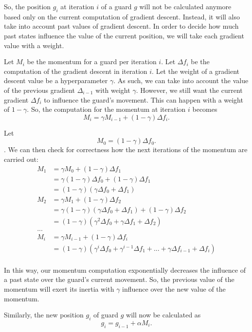 So, the position $g_i$ at iteration $i$ of a guard $g$ will not be calculated anymore based only on the current computation of gradient descent. Instead, it will also take into account past values of gradient descent. In order to decide how much past states influence the value of the current position, we will take each gradient value with a weight.

Let $M_i$ be the momentum for a guard per iteration $i$. Let $\Delta f_i$ be the computation of the gradient descent in iteration $i$. Let the weight of a gradient descent value be a hyperparameter $\gamma$. 
As such, we can take into account the value of the previous gradient $\Delta_{i - 1}$ with weight $\gamma$. However, we still want the current gradient $\Delta f_i$ to influence the guard's movement. This can happen with a weight of $1 - \gamma$. So, the computation for the momentum at iteration $i$ becomes $$M_i = \gamma M_{i - 1} + (1 - \gamma)\Delta f_i.$$

Let $$M_0 = (1 - \gamma) \Delta f_0.$$. We can then check for correctness how  the next iterations of the momentum are carried out:
\begin{align*}
    M_1 &= \gamma M_0 + (1 - \gamma) \Delta f_1 \\
        &= \gamma (1 - \gamma) \Delta f_0 + (1 - \gamma) \Delta f_1 \\
        &= (1 - \gamma) (\gamma \Delta f_0 + \Delta f_1) \\
    M_2 &= \gamma M_1 + (1 - \gamma) \Delta f_2 \\
        &= \gamma (1 - \gamma) (\gamma \Delta f_0 + \Delta f_1) + (1 - \gamma) \Delta f_2 \\
        &= (1 - \gamma) (\gamma^2 \Delta f_0 + \gamma \Delta f_1 + \Delta f_2) \\
    ... \\
    M_i &= \gamma M_{i - 1} + (1 - \gamma) \Delta f_i \\
        &= (1 - \gamma) (\gamma^i \Delta f_0 + \gamma^{i - 1} \Delta f_1 + ... + \gamma \Delta f_{i - 1} + \Delta f_i) \\
\end{align*}

In this way, our momentum computation exponentially decreases the influence of a past state over the guard's current movement. So, the previous value of the momentum will exert its inertia with $\gamma$ influence over the new value of the momentum.

Similarly, the new position $g_i$ of guard $g$ will now be calculated as $$g_i = g_{i - 1} + \alpha M_i.$$

